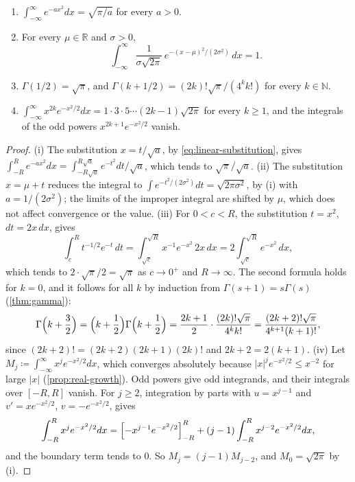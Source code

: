 \begin{corollary}
\label{cor:gaussian-consequences}
\leavevmode
\begin{enumerate}
\item $\int_{-\infty}^\infty e^{-ax^2}dx=\sqrt{\pi/a}$ for every $a>0$.
\item For every $\mu\in\mathbb R$ and $\sigma>0$,
\[
\int_{-\infty}^\infty\frac1{\sigma\sqrt{2\pi}}\,e^{-(x-\mu)^2/(2\sigma^2)}\,dx=1 .
\]
\item $\Gamma(1/2)=\sqrt\pi$, and $\Gamma(k+1/2)=(2k)!\sqrt\pi/(4^kk!)$ for every $k\in\mathbb N$.
\item $\int_{-\infty}^\infty x^{2k}e^{-x^2/2}dx=1\cdot3\cdot5\cdots(2k-1)\sqrt{2\pi}$ for every $k\ge1$, and the integrals of the odd powers $x^{2k+1}e^{-x^2/2}$ vanish.
\end{enumerate}
\end{corollary}

\begin{proof}
(i) The substitution $x=t/\sqrt a$, by \eqref{eq:linear-substitution}, gives $\int_{-R}^Re^{-ax^2}dx=\int_{-R\sqrt a}^{R\sqrt a}e^{-t^2}dt/\sqrt a$, which tends to $\sqrt\pi/\sqrt a$. (ii) The substitution $x=\mu+t$ reduces the integral to $\int e^{-t^2/(2\sigma^2)}dt=\sqrt{2\pi\sigma^2}$, by (i) with $a=1/(2\sigma^2)$; the limits of the improper integral are shifted by $\mu$, which does not affect convergence or the value. (iii) For $0<c<R$, the substitution $t=x^2$, $dt=2x\,dx$, gives
\[
\int_c^Rt^{-1/2}e^{-t}\,dt=\int_{\sqrt c}^{\sqrt R}x^{-1}e^{-x^2}\,2x\,dx=2\int_{\sqrt c}^{\sqrt R}e^{-x^2}\,dx ,
\]
which tends to $2\cdot\sqrt\pi/2=\sqrt\pi$ as $c\to0^+$ and $R\to\infty$. The second formula holds for $k=0$, and it follows for all $k$ by induction from $\Gamma(s+1)=s\Gamma(s)$ (\cref{thm:gamma}):
\[
\Gamma\Bigl(k+\frac32\Bigr)=\Bigl(k+\frac12\Bigr)\Gamma\Bigl(k+\frac12\Bigr)=\frac{2k+1}2\cdot\frac{(2k)!\sqrt\pi}{4^kk!}=\frac{(2k+2)!\sqrt\pi}{4^{k+1}(k+1)!},
\]
since $(2k+2)!=(2k+2)(2k+1)(2k)!$ and $2k+2=2(k+1)$. (iv) Let $M_j\coloneqq\int_{-\infty}^\infty x^je^{-x^2/2}dx$, which converges absolutely because $|x|^je^{-x^2/2}\le x^{-2}$ for large $|x|$ (\cref{prop:real-growth}). Odd powers give odd integrands, and their integrals over $[-R,R]$ vanish. For $j\ge2$, integration by parts with $u=x^{j-1}$ and $v'=xe^{-x^2/2}$, $v=-e^{-x^2/2}$, gives
\[
\int_{-R}^Rx^je^{-x^2/2}dx=\Bigl[-x^{j-1}e^{-x^2/2}\Bigr]_{-R}^R+(j-1)\int_{-R}^Rx^{j-2}e^{-x^2/2}dx ,
\]
and the boundary term tends to $0$. So $M_j=(j-1)M_{j-2}$, and $M_0=\sqrt{2\pi}$ by (i).
\end{proof}

